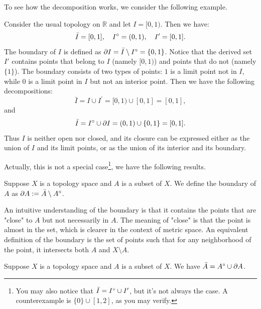 To see how the decomposition works, we consider the following example.
\begin{example}
    Consider the usual topology on $\mathbb{R}$ and let $I = [0,1)$. Then we have:
    \[
    \bar{I} = [0,1], \quad {I}^{\circ} = (0,1), \quad I' = [0,1].
    \]
    The boundary of $I$ is defined as $\partial I = \bar{I} \setminus {I}^{\circ} = \{0,1\}$. Notice that the derived set $I'$ contains points that belong to $I$ (namely $[0,1)$) and points that do not (namely $\{1\}$). The boundary consists of two types of points: $1$ is a limit point not in $I$, while $0$ is a limit point in $I$ but not an interior point. Then we have the following decompositions:
    \[
    \bar{I} = I \cup I^{\prime} = [0,1) \cup [0,1] = [0,1],
    \]
    and
    \[
    \bar{I} = {I}^{\circ} \cup \partial I = (0,1) \cup \{0,1\} = [0,1].
    \]
    Thus $I$ is neither open nor closed, and its closure can be expressed either as the union of $I$ and its limit points, or as the union of its interior and its boundary.
\end{example}

Actually, this is not a special case\footnote{You may also notice that $\bar{I} ={I}^{\circ} \cup I^{\prime}$, but it's not always the case. A counterexample is $\{0\} \cup [1,2]$, as you may verify.}, we have the following results.
\begin{definition}[Boundary]
    Suppose $X$ is a topology space and $A$ is a subset of $X$. We define the boundary of $A$ as $\partial A := \bar{A} \setminus {A}^{\circ}$.
\end{definition}
\begin{note}
    An intuitive understanding of the boundary is that it contains the points that are "close" to $A$ but not necessarily in $A$. The meaning of "close" is that the point is almost in the set, which is clearer in the context of metric space.
    An equivalent definition of the boundary is the set of points such that for any neighborhood of the point, it intersects both $A$ and $X\setminus A$.
\end{note}

\begin{theorem} 
    Suppose $X$ is a topology space and $A$ is a subset of $X$. We have
    $\bar{A} = {A}^{\circ} \cup \partial A$.
\end{theorem}


